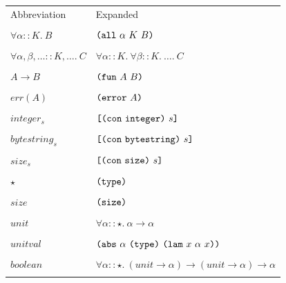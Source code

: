 \documentclass[../main.tex]{subfiles}
\begin{document}
\begin{figure*}[t]
    \footnotesize
    \centering
    \begin{tabular}{ll}
        \textrm{Abbreviation} & \textrm{Expanded}\\\\
        
        $\forall \alpha :: K.\ B$ & \(\texttt{(} \texttt{all} ~ \alpha ~ K ~ B \texttt{)}\)\\\\
        
        $\forall \alpha, \beta, \ldots :: K, \ldots.\ C$ & \(\forall \alpha :: K.\ \forall \beta :: K.\ \ldots.\ C\)\\\\
        
        $A \to B$ & \(\texttt{(} \texttt{fun} ~ A ~ B \texttt{)}\)\\\\
        
        $err(A)$ & \(\texttt{(} \texttt{error} ~ A \texttt{)}\)\\\\
        
        $integer_s$ & \(\texttt{[} \texttt{(} \texttt{con} ~ \texttt{integer} \texttt{)} ~ s \texttt{]}\)\\\\
        
        $bytestring_s$ & \(\texttt{[} \texttt{(} \texttt{con} ~ \texttt{bytestring} \texttt{)} ~ s \texttt{]}\)\\\\
        
        $size_s$ & \(\texttt{[} \texttt{(} \texttt{con} ~ \texttt{size} \texttt{)} ~ s \texttt{]}\)\\\\
        
        $\star$ & \(\texttt{(} \texttt{type} \texttt{)}{}\)\\\\
        
        $size$ & \(\texttt{(} \texttt{size} \texttt{)}{}\)\\\\
        
        $unit$ & \(\forall \alpha :: \star.\ \alpha \to \alpha\)\\\\
        
        $unitval$ & \(\texttt{(} \texttt{abs} ~ \alpha ~ \texttt{(} \texttt{type} \texttt{)}{} ~ \texttt{(} \texttt{lam} ~ x ~ \alpha ~ x \texttt{)} \texttt{)}\)\\\\
        
        $boolean$ & \(\forall \alpha :: \star.\ (unit \to \alpha) \to (unit \to \alpha) \to \alpha\)\\\\
        

\end{tabular}
\end{figure*}
\end{document}
